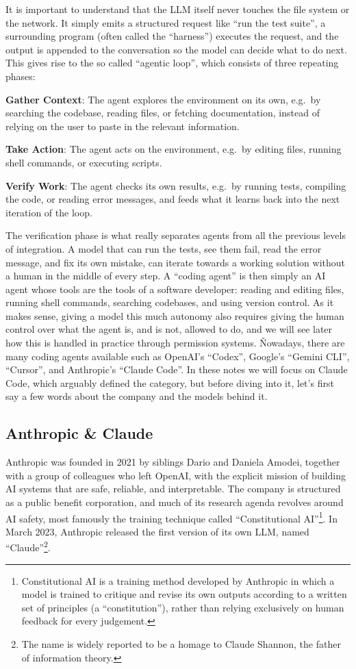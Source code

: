 It is important to understand that the LLM itself never touches the file system or the network. It simply emits a
structured request like ``run the test suite'', a surrounding program (often called the ``harness'') executes the
request, and the output is appended to the conversation so the model can decide what to do next. This gives rise to
the so called ``agentic loop'', which consists of three repeating phases:
\bit
\item \textbf{Gather Context}: The agent explores the environment on its own, e.g.\ by searching the codebase, reading
files, or fetching documentation, instead of relying on the user to paste in the relevant information.
\item \textbf{Take Action}: The agent acts on the environment, e.g.\ by editing files, running shell commands, or
executing scripts.
\item \textbf{Verify Work}: The agent checks its own results, e.g.\ by running tests, compiling the code, or reading
error messages, and feeds what it learns back into the next iteration of the loop.
\eit

The verification phase is what really separates agents from all the previous levels of integration. A model that can
run the tests, see them fail, read the error message, and fix its own mistake, can iterate towards a working solution
without a human in the middle of every step. A ``coding agent'' is then simply an AI agent whose tools are the tools
of a software developer: reading and editing files, running shell commands, searching codebases, and using version
control. As it makes sense, giving a model this much autonomy also requires giving the human control over what the
agent is, and is not, allowed to do, and we will see later how this is handled in practice through permission systems.
\v

Nowadays, there are many coding agents available such as OpenAI's ``Codex'', Google's ``Gemini CLI'', ``Cursor'', and
Anthropic's ``Claude Code''. In these notes we will focus on Claude Code, which arguably defined the category, but
before diving into it, let's first say a few words about the company and the models behind it.

\subsection{Anthropic \& Claude}

Anthropic was founded in 2021 by siblings Dario and Daniela Amodei, together with a group of colleagues who left
OpenAI, with the explicit mission of building AI systems that are safe, reliable, and interpretable. The company is
structured as a public benefit corporation, and much of its research agenda revolves around AI safety, most famously
the training technique called ``Constitutional AI''\footnote{Constitutional AI is a training method developed by
Anthropic in which a model is trained to critique and revise its own outputs according to a written set of principles
(a ``constitution''), rather than relying exclusively on human feedback for every judgement.}. In March 2023,
Anthropic released the first version of its own LLM, named ``Claude''\footnote{The name is widely reported to be a
homage to Claude Shannon, the father of information theory.}.

